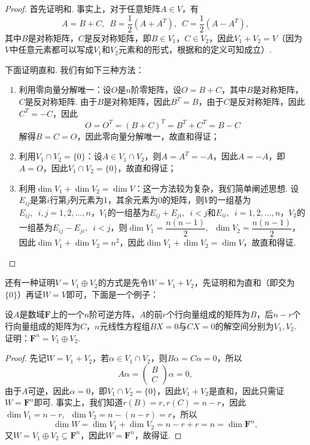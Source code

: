 \begin{proof}
    首先证明和. 事实上，对于任意矩阵$A\in V$，有
    \[A=B+C,\enspace B=\frac{1}{2}(A+A^T),\enspace C=\frac{1}{2}(A-A^T),\]
    其中$B$是对称矩阵，$C$是反对称矩阵，即$B\in V_1$，$C\in V_2$，因此$V_1+V_2=V$（因为$V$中任意元素都可以写成$V_1$和$V_2$元素和的形式，根据和的定义可知成立）.

    下面证明直和. 我们有如下三种方法：
    \begin{enumerate}
        \item 利用零向量分解唯一：设$O$是$n$阶零矩阵，设$O=B+C$，其中$B$是对称矩阵，$C$是反对称矩阵. 由于$B$是对称矩阵，因此$B^T=B$，由于$C$是反对称矩阵，因此$C^T=-C$，因此
              \[O=O^T=(B+C)^T=B^T+C^T=B-C\]
              解得$B=C=O$，因此零向量分解唯一，故直和得证；

        \item 利用$V_1\cap V_2=\{0\}$：设$A\in V_1\cap V_2$，则$A=A^T=-A$，因此$A=-A$，即$A=O$，因此$V_1\cap V_2=\{0\}$，故直和得证；

        \item 利用$\dim V_1+\dim V_2=\dim V$：这一方法较为复杂，我们简单阐述思想. 设$E_{ij}$是第$i$行第$j$列元素为1，其余元素为0的矩阵，则$V$的一组基为$E_{ij},\enspace i,j=1,2,\ldots,n$，$V_1$的一组基为$E_{ij}+E_{ji},\enspace i<j$和$E_{ii},\enspace i=1,2,\ldots,n$，$V_2$的一组基为$E_{ij}-E_{ji},\enspace i<j$，则$\dim V_1=\dfrac{n(n-1)}{2},\enspace \dim V_2=\dfrac{n(n-1)}{2}$，因此$\dim V_1+\dim V_2=n^2$，因此$\dim V_1+\dim V_2=\dim V$，故直和得证.
    \end{enumerate}
\end{proof}

还有一种证明$V=V_1\oplus V_2$的方式是先令$W=V_1+V_2$，先证明和为直和（即交为$\{0\}$）再证$W=V$即可，下面是一个例子：
\begin{example}{}{}
    设$A$是数域$\mathbf{F}$上的一个$n$阶可逆方阵，$A$的前$r$个行向量组成的矩阵为$B$，后$n-r$个行向量组成的矩阵为$C$，$n$元线性方程组$BX=0$与$CX=0$的解空间分别为$V_1,V_2$. 证明：$\mathbf{F}^n=V_1\oplus V_2$.
\end{example}

\begin{proof}
    先记$W=V_1+V_2$，若$\alpha\in V_1\cap V_2$，则$B\alpha=C\alpha=0$，所以
    \[A\alpha=\begin{pmatrix}
            B \\
            C
        \end{pmatrix}\alpha=0,\]
    由于$A$可逆，因此$\alpha=0$，即$V_1\cap V_2=\{0\}$，因此$V_1+V_2$是直和，因此只需证$W=\mathbf{F}^n$即可. 事实上，我们知道$r(B)=r,r(C)=n-r$，因此$\dim V_1=n-r,\enspace \dim V_2=n-(n-r)=r$，所以
    \[\dim W=\dim V_1+\dim V_2=n-r+r=n=\dim \mathbf{F}^n,\]
    又$W=V_1\oplus V_2\subseteq \mathbf{F}^n$，因此$W=\mathbf{F}^n$，故得证.
\end{proof}

